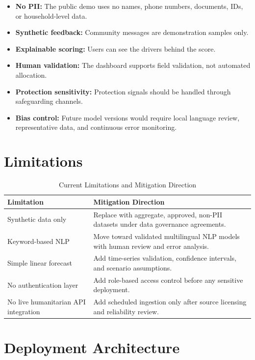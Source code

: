 \documentclass[11pt,a4paper]{article}
\begin{document}
\begin{itemize}
  \item \textbf{No PII:} The public demo uses no names, phone numbers, documents, IDs, or household-level data.
  \item \textbf{Synthetic feedback:} Community messages are demonstration samples only.
  \item \textbf{Explainable scoring:} Users can see the drivers behind the score.
  \item \textbf{Human validation:} The dashboard supports field validation, not automated allocation.
  \item \textbf{Protection sensitivity:} Protection signals should be handled through safeguarding channels.
  \item \textbf{Bias control:} Future model versions would require local language review, representative data, and continuous error monitoring.
\end{itemize}

\section{Limitations}

\begin{table}[H]
\centering
\caption{Current Limitations and Mitigation Direction}
\begin{tabularx}{\textwidth}{p{}Y}
\toprule
\textbf{Limitation} & \textbf{Mitigation Direction} \\
\midrule
Synthetic data only & Replace with aggregate, approved, non-PII datasets under data governance agreements. \\
Keyword-based NLP & Move toward validated multilingual NLP models with human review and error analysis. \\
Simple linear forecast & Add time-series validation, confidence intervals, and scenario assumptions. \\
No authentication layer & Add role-based access control before any sensitive deployment. \\
No live humanitarian API integration & Add scheduled ingestion only after source licensing and reliability review. \\
\bottomrule
\end{tabularx}
\end{table}

\section{Deployment Architecture}
\end{document}
